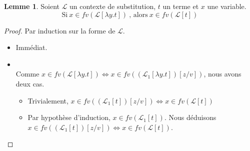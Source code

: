 \documentclass[11pt,a4paper]{article}
\theoremstyle{definition}
\newtheorem{lemma}[theorem]{Lemme}
\begin{document}
\begin{lemma}
  \label{lemma0}
  Soient $\mathcal{L}$ un contexte de substitution, $t$ un terme et $x$ une variable.
  \[ 
    \text{Si}~x \in fv(\mathcal{L}[\lambda y.t])~\text{, alors}~x \in fv(\mathcal{L}[t])
  \]
\end{lemma}
\begin{proof}
  Par induction sur la forme de $\mathcal{L}$.
  \begin{itemize}
    \item {} Immédiat.
    \item {}\\
      Comme $x\in fv(\mathcal{L}[\lambda y.t]) \Leftrightarrow x \in fv((\mathcal{L}_1[\lambda y.t])[z/v])$, nous avons deux cas.
      \begin{itemize}
        \item {} Trivialement, $x \in fv((\mathcal{L}_1[t])[z/v]) \Leftrightarrow x\in fv(\mathcal{L}[t])$
        \item {}
          Par hypothèse d'induction, $x\in fv(\mathcal{L}_1[t])$.
          Nous déduisons $x \in fv((\mathcal{L}_1[t])[z/v]) \Leftrightarrow x\in fv(\mathcal{L}[t])$.
      \end{itemize}
  \end{itemize}
\end{proof}
\end{document}
